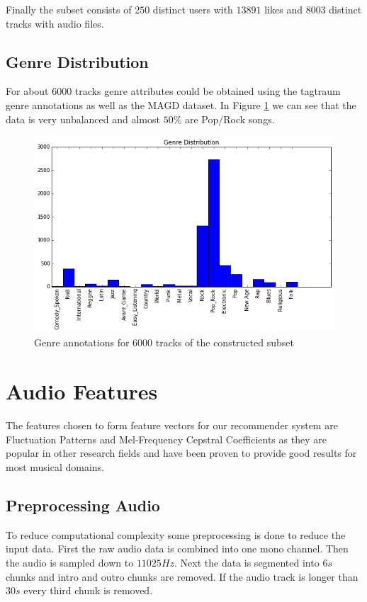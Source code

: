 \documentclass[cic,tc,english]{iiufrgs}
\begin{document}
Finally the subset consists of $250$ distinct users with $13891$ likes and $8003$ distinct tracks with audio files.

\subsection{Genre Distribution}
For about 6000 tracks genre attributes could be obtained using the tagtraum genre annotations \cite{schreiber2015improving} as well as the MAGD dataset\cite{magd}. In Figure \ref{fig:genres} we can see that the data is very unbalanced and almost $50\%$ are Pop/Rock songs.

\begin{figure}
    \caption{Genre annotations for $6000$ tracks of the constructed subset}
    \begin{center}
        \includegraphics[width=\linewidth]{genres}
    \end{center}
    \label{fig:genres}
\end{figure}

\section{Audio Features}
The features chosen to form feature vectors for our recommender system are Fluctuation Patterns and Mel-Frequency Cepstral Coefficients as they are popular in other research fields and have been proven to provide good results for most musical domains.

\subsection{Preprocessing Audio} \label{sec:preprocessing}
To reduce computational complexity some preprocessing is done to reduce the input data. First the raw audio data is combined into one mono channel. Then the audio is sampled down to $11025Hz$. Next the data is segmented into $6s$ chunks and intro and outro chunks are removed. If the audio track is longer than $30s$ every third chunk is removed.
\end{document}

